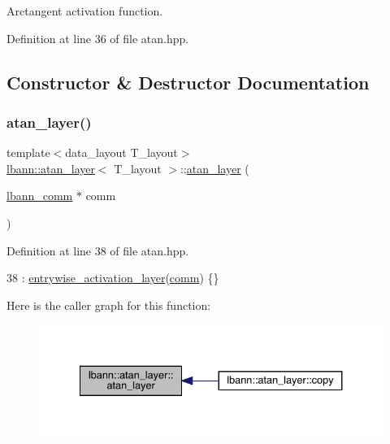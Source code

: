Arctangent activation function. 

Definition at line 36 of file atan.\+hpp.



\subsection{Constructor \& Destructor Documentation}
\mbox{\label{classlbann_1_1atan__layer_a8cd5a9ea7688bde095ca6745d372fd4a}} 
\subsubsection{\texorpdfstring{atan\+\_\+layer()}{atan\_layer()}}
{\footnotesize\ttfamily template$<$data\+\_\+layout T\+\_\+layout$>$ \\
\hyperlink{classlbann_1_1atan__layer}{lbann\+::atan\+\_\+layer}$<$ T\+\_\+layout $>$\+::\hyperlink{classlbann_1_1atan__layer}{atan\+\_\+layer} (\begin{DoxyParamCaption}\item[{\hyperlink{classlbann_1_1lbann__comm}{lbann\+\_\+comm} $\ast$}]{comm }\end{DoxyParamCaption})\hspace{0.3cm}{\ttfamily [inline]}}



Definition at line 38 of file atan.\+hpp.


\begin{DoxyCode}
38 : \hyperlink{classlbann_1_1entrywise__activation__layer_aada1d9200612dcd13259799ef327c557}{entrywise\_activation\_layer}(\hyperlink{file__io_8cpp_ab048c6f9fcbcfaa57ce68b00263dbebe}{comm}) \{\}
\end{DoxyCode}
Here is the caller graph for this function\+:\nopagebreak
\begin{figure}[H]
\begin{center}
\leavevmode
\includegraphics[width=334pt]{classlbann_1_1atan__layer_a8cd5a9ea7688bde095ca6745d372fd4a_icgraph}
\end{center}
\end{figure}


